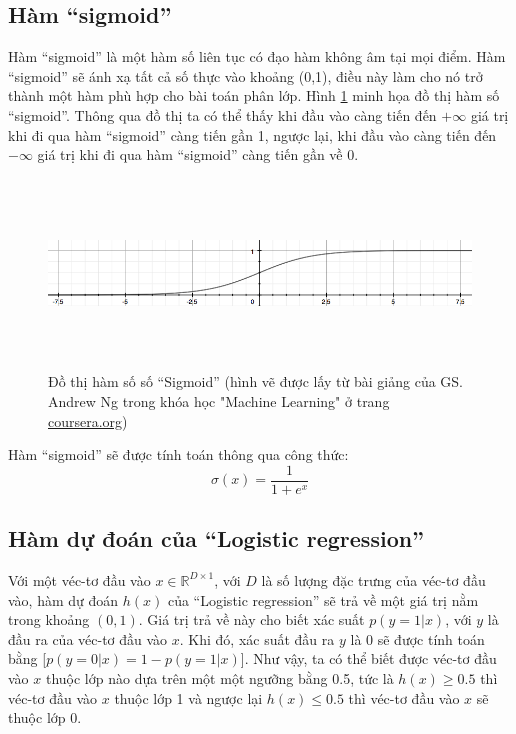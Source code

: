 \subsection{Hàm ``sigmoid''}
Hàm ``sigmoid'' là một hàm số liên tục có đạo hàm không âm tại mọi điểm. Hàm ``sigmoid'' sẽ ánh xạ tất cả số thực vào khoảng (0,1), điều này làm cho nó trở thành một hàm phù hợp cho bài toán phân lớp. Hình \ref{fig:2.2_sigmoid} minh họa đồ thị hàm số ``sigmoid''. Thông qua đồ thị ta có thể thấy khi đầu vào càng tiến đến $+\infty$ giá trị khi đi qua hàm ``sigmoid'' càng tiến gần 1, ngược lại, khi đầu vào càng tiến đến $-\infty$ giá trị khi đi qua hàm ``sigmoid'' càng tiến gần về 0.
\begin{figure}[h]
    \centering
    \includegraphics[width=\textwidth, height=5cm]{images/Chapter2/sigmoid.png}
    \caption{Đồ thị hàm số số ``Sigmoid'' (hình vẽ được lấy từ bài giảng của GS. Andrew Ng trong khóa học "Machine Learning" ở trang \href{https://www.coursera.org/learn/machine-learning}{coursera.org})}
    \label{fig:2.2_sigmoid}
\end{figure}

Hàm ``sigmoid'' sẽ được tính toán thông qua công thức:
\begin{equation}
    \sigma(x) = \frac{1}{1+ e^{x}}
    \label{eq:2.2_sigmoid}
\end{equation}

\subsection{Hàm dự đoán của ``Logistic regression''}
Với một véc-tơ đầu vào $x \in \mathbb{R}^{D\times 1}$, với $D$ là số lượng đặc trưng của véc-tơ đầu vào, hàm dự đoán $h(x)$ của ``Logistic regression'' sẽ trả về một giá trị nằm trong khoảng $(0,1)$. Giá trị trả về này cho biết xác suất $p(y=1|x)$, với $y$ là đầu ra của véc-tơ đầu vào $x$. Khi đó, xác suất đầu ra $y$ là 0 sẽ được tính toán bằng [$p(y=0|x) = 1 - p(y=1|x)$]. Như vậy, ta có thể biết được véc-tơ đầu vào $x$ thuộc lớp nào dựa trên một một ngưỡng bằng 0.5, tức là $h(x) \geq 0.5$ thì véc-tơ đầu vào $x$ thuộc lớp 1 và ngược lại $h(x) \leq 0.5$ thì véc-tơ đầu vào $x$ sẽ thuộc lớp 0.

